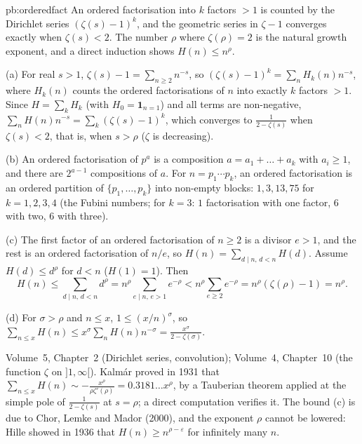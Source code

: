 \begin{solution}{pb:orderedfact}
\idea An ordered factorisation into $k$ factors $>1$ is counted by the Dirichlet series $(\zeta(s)-1)^k$, and the geometric series in
$\zeta-1$ converges exactly when $\zeta(s)<2$. The number $\rho$ where $\zeta(\rho)=2$ is the natural growth exponent, and a direct
induction shows $H(n)\le n^\rho$.

\writeup (a) For real $s>1$, $\zeta(s)-1=\sum_{n\ge2}n^{-s}$, so $(\zeta(s)-1)^k=\sum_nH_k(n)n^{-s}$, where $H_k(n)$ counts the ordered
factorisations of $n$ into exactly $k$ factors $>1$. Since $H=\sum_kH_k$ (with $H_0=\mathbf1_{n=1}$) and all terms are non-negative,
$\sum_nH(n)n^{-s}=\sum_k(\zeta(s)-1)^k$, which converges to $\frac1{2-\zeta(s)}$ when $\zeta(s)<2$, that is, when $s>\rho$ ($\zeta$ is decreasing).

(b) An ordered factorisation of $p^a$ is a composition $a=a_1+\dots+a_k$ with $a_i\ge1$, and there are $2^{a-1}$ compositions of $a$.
For $n=p_1\cdots p_k$, an ordered factorisation is an ordered partition of $\{p_1,\dots,p_k\}$ into non-empty blocks: $1,3,13,75$
for $k=1,2,3,4$ (the Fubini numbers; for $k=3$: $1$ factorisation with one factor, $6$ with two, $6$ with three).

(c) The first factor of an ordered factorisation of $n\ge2$ is a divisor $e>1$, and the rest is an ordered factorisation of $n/e$, so
$H(n)=\sum_{d\mid n,\,d<n}H(d)$. Assume $H(d)\le d^\rho$ for $d<n$ ($H(1)=1$). Then
\[
H(n)\le\sum_{d\mid n,\,d<n}d^\rho=n^\rho\sum_{e\mid n,\,e>1}e^{-\rho}<n^\rho\sum_{e\ge2}e^{-\rho}=n^\rho(\zeta(\rho)-1)=n^\rho.
\]

(d) For $\sigma>\rho$ and $n\le x$, $1\le(x/n)^\sigma$, so $\sum_{n\le x}H(n)\le x^\sigma\sum_nH(n)n^{-\sigma}=\frac{x^\sigma}{2-\zeta(\sigma)}$.

\tools Volume~5, Chapter~2 (Dirichlet series, convolution); Volume~4, Chapter~10 (the function $\zeta$ on $]1,\infty[$).
\leads Kalmár proved in 1931 that $\sum_{n\le x}H(n)\sim-\frac{x^\rho}{\rho\zeta'(\rho)}=0.3181\ldots x^\rho$, by a Tauberian theorem
applied at the simple pole of $\frac1{2-\zeta(s)}$ at $s=\rho$; a direct computation verifies it. The bound (c) is due to Chor, Lemke and
Mador (2000), and the exponent $\rho$ cannot be lowered: Hille showed in 1936 that $H(n)\ge n^{\rho-\varepsilon}$ for infinitely many $n$.
\end{solution}

